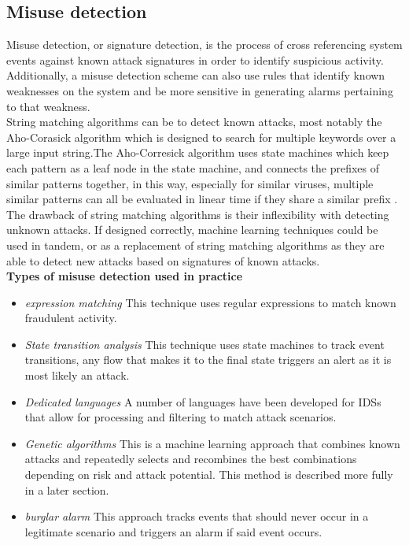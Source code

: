\documentclass[12pt]{article} %
\begin{document}
\subsection{Misuse detection}
Misuse detection, or signature detection, is the process of cross referencing system events against known attack signatures in order to identify suspicious activity. Additionally, a misuse detection scheme can also use rules that identify known weaknesses on the system and be more sensitive in generating alarms pertaining to that weakness.\\
String matching algorithms can be to detect known attacks, most notably the Aho-Corasick algorithm which is designed to search for multiple keywords over a large input string.The Aho-Corresick algorithm uses state machines which keep each pattern as a leaf node in the state machine, and connects the prefixes of similar patterns together, in this way, especially for similar viruses, multiple similar patterns can all be evaluated in linear time if they share a similar prefix \cite{tuck04}.\\
The drawback of string matching algorithms is their inflexibility with detecting unknown attacks. If designed correctly, machine learning techniques could be used in tandem, or as a replacement of string matching algorithms as they are able to detect new attacks based on signatures of known attacks.\\

\textbf{Types of misuse detection used in practice}\cite{verwoerd99}
\begin{itemize}
    \item \textit{expression matching} This technique uses regular expressions to match known fraudulent activity.\\
    \item \textit{State transition analysis} This technique uses state machines to track event transitions, any flow that makes it to the final state triggers an alert as it is most likely an attack.\\
    \item \textit{Dedicated languages} A number of languages have been developed for IDSs that allow for processing and filtering to match attack scenarios.\\
    \item \textit{Genetic algorithms} This is a machine learning approach that combines known attacks and repeatedly selects and recombines the best combinations depending on risk and attack potential. This method is described more fully in a later section.\\
    \item \textit{burglar alarm} This approach tracks events that should never occur in a legitimate scenario and triggers an alarm if said event occurs.\\
\end{itemize}
\end{document}
